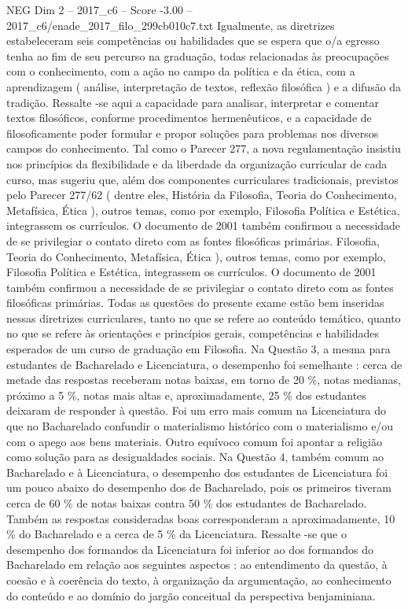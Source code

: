 \begin{textsample}{NEG Dim 2 – 2017\_c6 – Score -3.00 – 2017\_c6/enade\_2017\_filo\_299cb010c7.txt}
Igualmente, as diretrizes estabeleceram seis competências ou habilidades que se espera que o/a egresso tenha ao fim de seu percurso na graduação, todas relacionadas às preocupações com o conhecimento, com a ação no campo da política e da ética, com a aprendizagem ( análise, interpretação de textos, reflexão filosófica ) e a difusão da tradição.
Ressalte -se aqui a capacidade para analisar, interpretar e comentar textos filosóficos, conforme procedimentos hermenêuticos, e a capacidade de filosoficamente poder formular e propor soluções para problemas nos diversos campos do conhecimento.
Tal como o Parecer 277, a nova regulamentação insistiu nos princípios da flexibilidade e da liberdade da organização curricular de cada curso, mas sugeriu que, além dos componentes curriculares tradicionais, previstos pelo Parecer 277/62 ( dentre eles, História da Filosofia, Teoria do Conhecimento, Metafísica, Ética ), outros temas, como por exemplo, Filosofia Política e Estética, integrassem os currículos.
O documento de 2001 também confirmou a necessidade de se privilegiar o contato direto com as fontes filosóficas primárias.
Filosofia, Teoria do Conhecimento, Metafísica, Ética ), outros temas, como por exemplo, Filosofia Política e Estética, integrassem os currículos.
O documento de 2001 também confirmou a necessidade de se privilegiar o contato direto com as fontes filosóficas primárias.
Todas as questões do presente exame estão bem inseridas nessas diretrizes curriculares, tanto no que se refere ao conteúdo temático, quanto no que se refere às orientações e princípios gerais, competências e habilidades esperados de um curso de graduação em Filosofia.
Na Questão 3, a mesma para estudantes de Bacharelado e Licenciatura, o desempenho foi semelhante : cerca de metade das respostas receberam notas baixas, em torno de 20 \%, notas medianas, próximo a 5 \%, notas mais altas e, aproximadamente, 25 \% dos estudantes deixaram de responder à questão.
Foi um erro mais comum na Licenciatura do que no Bacharelado confundir o materialismo histórico com o materialismo e/ou com o apego aos bens materiais.
Outro equívoco comum foi apontar a religião como solução para as desigualdades sociais.
Na Questão 4, também comum ao Bacharelado e à Licenciatura, o desempenho dos estudantes de Licenciatura foi um pouco abaixo do desempenho dos de Bacharelado, pois os primeiros tiveram cerca de 60 \% de notas baixas contra 50 \% dos estudantes de Bacharelado.
Também as respostas consideradas boas corresponderam a aproximadamente, 10 \% do Bacharelado e a cerca de 5 \% da Licenciatura.
Ressalte -se que o desempenho dos formandos da Licenciatura foi inferior ao dos formandos do Bacharelado em relação aos seguintes aspectos : ao entendimento da questão, à coesão e à coerência do texto, à organização da argumentação, ao conhecimento do conteúdo e ao domínio do jargão conceitual da perspectiva benjaminiana.

\end{textsample}
